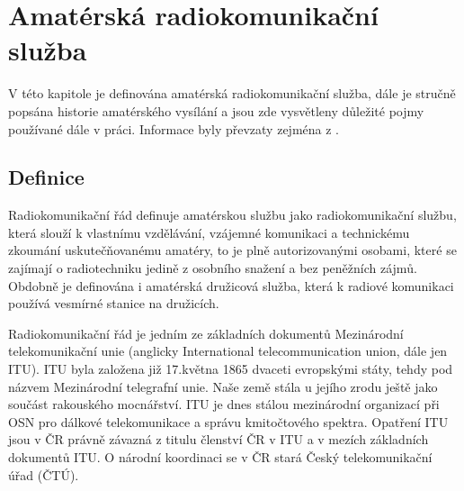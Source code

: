 
\chapter{Amatérská radiokomunikační služba}
\label{radioamateri}

V této kapitole je definována amatérská radiokomunikační služba, dále je stručně popsána historie amatérského vysílání a jsou zde vysvětleny důležité pojmy používané dále v práci. Informace byly převzaty zejména z \cite{crk_hist}.

\section{Definice}
\label{radioamateri_def}

Radiokomunikační řád definuje amatérskou službu jako
radiokomunikační službu, která slouží k vlastnímu vzdělávání, vzájemné
komunikaci a technickému zkoumání uskutečňovanému amatéry, to je plně
autorizovanými osobami, které se zajímají o radiotechniku jedině z osobního
snažení a bez peněžních zájmů. Obdobně je definována i amatérská družicová
služba, která k radiové komunikaci používá vesmírné stanice na družicích.

Radiokomunikační řád je jedním ze základních dokumentů Mezinárodní
telekomunikační unie (anglicky International telecommunication union, dále jen
ITU). %
ITU byla založena již 17.května 1865 dvaceti evropskými státy, tehdy pod názvem Mezinárodní telegrafní
unie. Naše země stála u jejího zrodu ještě jako součást rakouského mocnářství. ITU
je dnes stálou mezinárodní organizací při OSN pro dálkové telekomunikace a
správu kmitočtového spektra.
Opatření ITU jsou v ČR právně závazná z titulu členství ČR v ITU a v
mezích základních dokumentů ITU. O národní koordinaci se v ČR stará
Český telekomunikační úřad (ČTÚ). %

